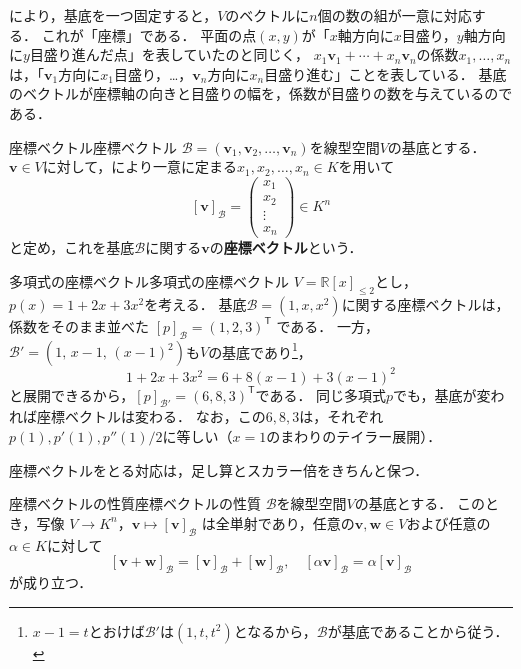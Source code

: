 により，基底を一つ固定すると，$V$のベクトルに$n$個の数の組が一意に対応する．
これが「座標」である．
平面の点$(x,y)$が「$x$軸方向に$x$目盛り，$y$軸方向に$y$目盛り進んだ点」を表していたのと同じく，
$x_1\bm{v}_1+\cdots+x_n\bm{v}_n$の係数$x_1,\dots,x_n$は，「$\bm{v}_1$方向に$x_1$目盛り，…，$\bm{v}_n$方向に$x_n$目盛り進む」ことを表している．
基底のベクトルが座標軸の向きと目盛りの幅を，係数が目盛りの数を与えているのである．

\begin{definition}{座標ベクトル}{座標ベクトル}
  $\mathcal{B} = (\bm{v}_1, \bm{v}_2, \dots, \bm{v}_n)$を線型空間$V$の基底とする．
  $\bm{v} \in V$に対して，により一意に定まる$x_1, x_2, \dots, x_n \in K$を用いて
  \[
    [\bm{v}]_{\mathcal{B}}
    = \begin{pmatrix} x_1 \\ x_2 \\ \vdots \\ x_n \end{pmatrix} \in K^n
  \]
  と定め，これを基底$\mathcal{B}$に関する$\bm{v}$の\textbf{座標ベクトル}という．
\end{definition}

\begin{example}{多項式の座標ベクトル}{多項式の座標ベクトル}
  $V=\mathbb{R}[x]_{\le 2}$とし，$p(x)=1+2x+3x^2$を考える．
  基底$\mathcal{B}=(1,x,x^2)$に関する座標ベクトルは，係数をそのまま並べた
  $[p]_{\mathcal{B}}=(1,2,3)^\mathsf{T}$
  である．
  一方，$\mathcal{B}'=(1,\,x-1,\,(x-1)^2)$も$V$の基底であり\footnote{$x-1=t$とおけば$\mathcal{B}'$は$(1,t,t^2)$となるから，$\mathcal{B}$が基底であることから従う．}，
  \[
    1+2x+3x^2 = 6+8(x-1)+3(x-1)^2
  \]
  と展開できるから，$[p]_{\mathcal{B}'}=(6,8,3)^\mathsf{T}$である．
  同じ多項式$p$でも，基底が変われば座標ベクトルは変わる．
  なお，この$6,8,3$は，それぞれ$p(1),p'(1),p''(1)/2$に等しい（$x=1$のまわりのテイラー展開）．
\end{example}

座標ベクトルをとる対応は，足し算とスカラー倍をきちんと保つ．

\begin{prop}{座標ベクトルの性質}{座標ベクトルの性質}
  $\mathcal{B}$を線型空間$V$の基底とする．
  このとき，写像
  $V \to K^n$，$\bm{v} \mapsto [\bm{v}]_{\mathcal{B}}$
  は全単射であり，任意の$\bm{v}, \bm{w} \in V$および任意の$\alpha \in K$に対して
  \[
    [\bm{v} + \bm{w}]_{\mathcal{B}} = [\bm{v}]_{\mathcal{B}} + [\bm{w}]_{\mathcal{B}},
    \quad
    [\alpha \bm{v}]_{\mathcal{B}} = \alpha [\bm{v}]_{\mathcal{B}}
  \]
  が成り立つ．
\end{prop}

